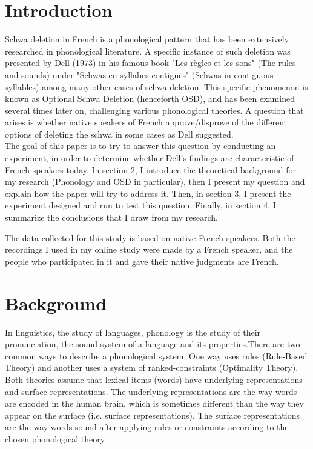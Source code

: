\documentclass{article}
\begin{document}
\section{Introduction} %
Schwa deletion in French is a phonological pattern that has been extensively researched in phonological literature. A specific instance of such deletion was presented by Dell (1973) in his famous book "Les règles et les sons" (The rules and sounds) under "Schwas en syllabes contiguës" (Schwas in contiguous syllables) among many other cases of schwa deletion. This specific phenomenon is known as Optional Schwa Deletion (henceforth OSD), and has been examined several times later on,  challenging various phonological theories. A question that arises is whether native speakers of French approve/disprove of the different options of deleting the schwa in some cases as Dell suggested.\\

The goal of this paper is to try to answer this question by conducting an experiment, in order to determine whether Dell's findings are characteristic of  French speakers today. In section 2, I introduce the theoretical background for my research (Phonology and OSD in particular),  then I present my question and explain how the paper will try to address it. Then,  in section 3,  I present the experiment designed and run to test this question. Finally,  in section 4,  I summarize the conclusions that I draw from my research.

The data collected for this study is based on native French speakers. Both the recordings I used in my online study were made by a French speaker, and the people who participated in it and gave their native judgments are French.

\clearpage
\section{Background} %
In linguistics, the study of languages, phonology is the study of their pronunciation,  the sound system of a language and its properties.There are two common ways to describe a phonological system. One way uses rules (Rule-Based Theory) and another uses a system of ranked-constraints (Optimality Theory). Both theories assume that lexical items (words) have underlying representations and surface representations. The underlying representations are the
way words are encoded in the human brain, which is sometimes different than the way they appear on the surface (i.e. surface representations). The surface representations are the way words sound after applying rules or constraints according to the chosen phonological theory. 
\end{document}
